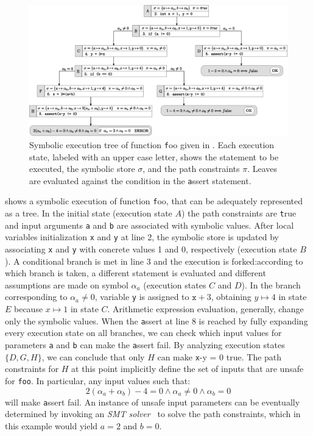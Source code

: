 \begin{figure}[t]
	\centering
	\includegraphics[width=0.975\columnwidth]{images/execution-tree.eps} 
	\caption{Symbolic execution tree of function {\texttt foo} given in . Each execution state, labeled with an upper case letter, shows the statement to be executed, the symbolic store $\sigma$, and the path constraints $\pi$. Leaves are evaluated against the condition in the {\texttt assert} statement. }
	\label{fig:example-symbolic-execution}
	\vspace{-1mm}
\end{figure}

\noindent {} shows a symbolic execution of function {\texttt foo}, that can be adequately represented as a tree. In the initial state (execution state $A$) the path constraints are {\texttt true} and input arguments {\texttt a} and {\texttt b} are associated with symbolic values. 
After local variables initialization {\texttt x} and {\texttt y} at line 2, the symbolic store is updated by associating {\texttt x} and {\texttt y} with concrete values 1 and 0, respectively (execution state $B$). A conditional branch is met in line 3 and the execution is forked:according to which branch is taken, a different statement is evaluated and different assumptions are made on symbol $\alpha_a$ (execution states $C$ and $D$). In the branch corresponding to $\alpha_a\neq 0$, variable {\texttt y} is assigned to  ${\texttt x}+3$, obtaining $y\mapsto 4$ in state $E$ because $x\mapsto 1$ in state $C$. Arithmetic expression evaluation, generally, change only the symbolic values.
When the {\texttt assert} at line 8 is reached by fully expanding every execution state  on all branches, we can check which input values for parameters {\texttt a} and {\texttt b} can make the {\texttt assert} fail. By analyzing execution states $\{D,G,H\}$, we can conclude that only $H$ can make {\texttt x-y = 0} true. The path constraints for $H$ at this point implicitly define the set of inputs that are unsafe for \texttt{foo}. 
In particular, any input values such that:
\[ 2(\alpha_a+\alpha_b)-4 = 0 \wedge \alpha_a \neq 0 \wedge \alpha_b = 0 \]
will make {\texttt assert} fail. An instance of unsafe input parameters can be eventually determined by invoking an {\em SMT solver}~\cite{BKM14} to solve the path constraints, which in this example would yield $a = 2$ and $b = 0$.

